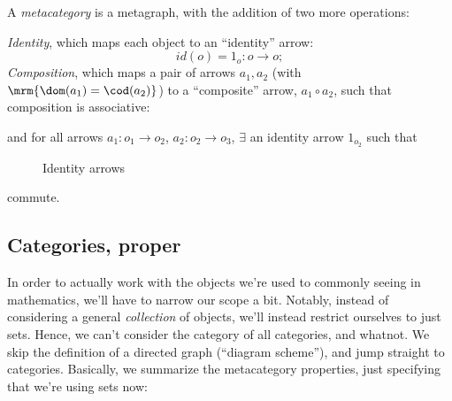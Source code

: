\begin{definition}[Metacategory]
  A \emph{metacategory} is a metagraph, with the addition of two more
  operations:

  \emph{Identity}, which maps each object to an ``identity'' arrow:
  \[
    id(o) = 1_o : o \to o;
  \]
  \emph{Composition}, which maps a pair of arrows $a_1, a_2$ (with
  $\mrm{\dom(a_1) = \cod(a_2)}$) to a ``composite'' arrow, $a_1 \circ
  a_2$, such that composition is associative:
  \begin{figure}[H]
    \centering
  \end{figure}
  and for all arrows $a_1
  : o_1 \to o_2$, $a_2 : o_2 \to o_3$, $\exists$ an identity arrow
  $1_{o_2}$ such that
  \begin{figure}[H]
    \centering
    \begin{minipage}{.49\linewidth}
      \centering
    \end{minipage}
    \begin{minipage}{.49\linewidth}
      \centering
    \end{minipage}
    \caption{Identity arrows}
  \end{figure}
  commute.
\end{definition}

\subsection{Categories, proper}
In order to actually work with the objects we're used to commonly
seeing in mathematics, we'll have to narrow our scope a bit. Notably,
instead of considering a general \emph{collection} of objects, we'll
instead restrict ourselves to just sets. Hence, we can't consider the
category of all categories, and whatnot. We skip the definition of a
directed graph (``diagram scheme''), and jump straight to categories.
Basically, we summarize the metacategory properties, just specifying
that we're using sets now:

